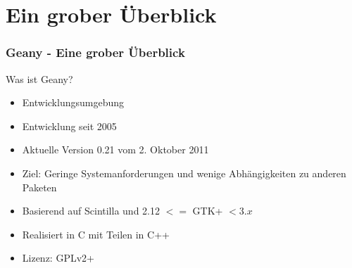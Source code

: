 \section[Einordnung]{Ein grober Überblick}
\begin{frame}
	\frametitle{Geany - Eine grober Überblick}
	\begin{block}{Was ist Geany?}
		\begin{itemize}
			\item Entwicklungsumgebung
			\item Entwicklung seit 2005
			\item Aktuelle Version 0.21 vom 2. Oktober 2011
			\item Ziel: Geringe Systemanforderungen und wenige
				  Abhängigkeiten zu anderen Paketen
			\item Basierend auf Scintilla und 2.12 $<=$ GTK+ $<3.x$
			\item Realisiert in C mit Teilen in C++
			\item Lizenz: GPLv2+
		\end{itemize}
	\end{block}
\end{frame}
